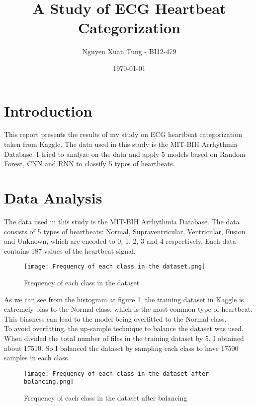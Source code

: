 \documentclass{article}
\title{A Study of ECG Heartbeat Categorization}
\author{Nguyen Xuan Tung - BI12-479}
\date{\today}
\begin{document}
\maketitle
\section{Introduction}

This report presents the results of my study on ECG heartbeat categorization taken from Kaggle. 
The data used in this study is the MIT-BIH Arrhythmia Database.
I tried to analyze on the data and apply 5 models based on Random Forest, CNN and RNN to classify 5 types of heartbeats. 

\section{Data Analysis}
The data used in this study is the MIT-BIH Arrhythmia Database.
The data consists of 5 types of heartbeats: Normal, Supraventricular, Ventricular, Fusion and Unknown, 
which are encoded to 0, 1, 2, 3 and 4 respectively. Each data contains 187 values of the heartbeat signal.\\ 

\begin{figure}[h]
\centering
\texttt{[image: Frequency of each class in the dataset.png]}
\caption{Frequency of each class in the dataset}
\end{figure}

\noindent As we can see from the histogram at figure 1,
the training dataset in Kaggle is extremely bias to
the Normal class, which is the most common type of heartbeat. 
This biasness can lead to the model being overfitted to the Normal class.\\


\noindent To avoid overfitting, the up-sample technique to balance the dataset was used.
When divided the total number of files in the training dataset by 5,
I obtained about 17510. So I balanced the dataset by sampling each class to have 17500 samples in each class.\\
\begin{figure}[h]
\centering
\texttt{[image: Frequency of each class in the dataset after balancing.png]}
\caption{Frequency of each class in the dataset after balancing}
\end{figure}
\end{document}
